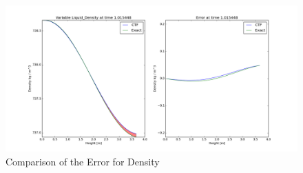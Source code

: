 \begin{figure}[!h]
	\centering
	\includegraphics[width=1.10\textwidth]{images/Error_comparison_rho.png}
	\caption{Comparison of the Error for Density}
	\label{fig:Error_comparison_rho}
\end{figure}






